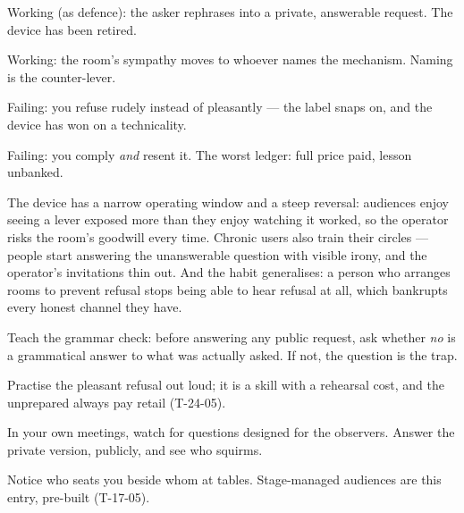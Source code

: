 \begin{feedback}
  \item Working (as defence): the asker rephrases into a private, answerable request. The device has been retired.
  \item Working: the room's sympathy moves to whoever names the mechanism. Naming is the counter-lever.
  \item Failing: you refuse rudely instead of pleasantly --- the label snaps on, and the device has won on a technicality.
  \item Failing: you comply \emph{and} resent it. The worst ledger: full price paid, lesson unbanked.
\end{feedback}
\begin{failure}
The device has a narrow operating window and a steep reversal: audiences enjoy seeing a lever exposed more than they enjoy watching it worked, so the operator risks the room's goodwill every time. Chronic users also train their circles --- people start answering the unanswerable question with visible irony, and the operator's invitations thin out. And the habit generalises: a person who arranges rooms to prevent refusal stops being able to hear refusal at all, which bankrupts every honest channel they have.
\end{failure}
\begin{countermeasures}
  \item Teach the grammar check: before answering any public request, ask whether \emph{no} is a grammatical answer to what was actually asked. If not, the question is the trap.
  \item Practise the pleasant refusal out loud; it is a skill with a rehearsal cost, and the unprepared always pay retail (T-24-05).
  \item In your own meetings, watch for questions designed for the observers. Answer the private version, publicly, and see who squirms.
  \item Notice who seats you beside whom at tables. Stage-managed audiences are this entry, pre-built (T-17-05).
\end{countermeasures}

\seesources
{}
